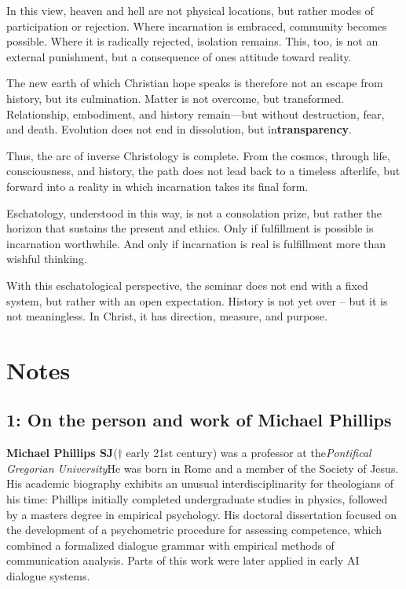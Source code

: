 \documentclass[
]{article}
\begin{document}
In this view, heaven and hell are not physical locations, but rather modes of participation or rejection. Where incarnation is embraced, community becomes possible. Where it is radically rejected, isolation remains. This, too, is not an external punishment, but a consequence of one\textquotesingle s attitude toward reality.

The new earth of which Christian hope speaks is therefore not an escape from history, but its culmination. Matter is not overcome, but transformed. Relationship, embodiment, and history remain---but without destruction, fear, and death. Evolution does not end in dissolution, but in\textbf{transparency}.

Thus, the arc of inverse Christology is complete. From the cosmos, through life, consciousness, and history, the path does not lead back to a timeless afterlife, but forward into a reality in which incarnation takes its final form.

Eschatology, understood in this way, is not a consolation prize, but rather the horizon that sustains the present and ethics. Only if fulfillment is possible is incarnation worthwhile. And only if incarnation is real is fulfillment more than wishful thinking.

With this eschatological perspective, the seminar does not end with a fixed system, but rather with an open expectation. History is not yet over -- but it is not meaningless. In Christ, it has direction, measure, and purpose.

\section{Notes}\label{notes}

\subsection{1: On the person and work of Michael Phillips}\label{on-the-person-and-work-of-michael-phillips}

\textbf{Michael Phillips SJ}(† early 21st century) was a professor at the\emph{Pontifical Gregorian University}He was born in Rome and a member of the Society of Jesus. His academic biography exhibits an unusual interdisciplinarity for theologians of his time: Phillips initially completed undergraduate studies in physics, followed by a master\textquotesingle s degree in empirical psychology. His doctoral dissertation focused on the development of a psychometric procedure for assessing competence, which combined a formalized dialogue grammar with empirical methods of communication analysis. Parts of this work were later applied in early AI dialogue systems.
\end{document}

